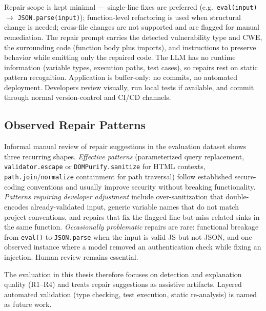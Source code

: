 Repair scope is kept minimal --- single-line fixes are preferred (e.g.\ \texttt{eval(input)} $\to$ \texttt{JSON.parse(input)}); function-level refactoring is used when structural change is needed; cross-file changes are not supported and are flagged for manual remediation. The repair prompt carries the detected vulnerability type and CWE, the surrounding code (function body plus imports), and instructions to preserve behavior while emitting only the repaired code. The LLM has no runtime information (variable types, execution paths, test cases), so repairs rest on static pattern recognition. Application is buffer-only: no commits, no automated deployment. Developers review visually, run local tests if available, and commit through normal version-control and CI/CD channels.

\subsection{Observed Repair Patterns}

Informal manual review of repair suggestions in the evaluation dataset shows three recurring shapes. \emph{Effective patterns} (parameterized query replacement, \texttt{validator.escape} or \texttt{DOMPurify.sanitize} for HTML contexts, \texttt{path.join}/\texttt{normalize} containment for path traversal) follow established secure-coding conventions and usually improve security without breaking functionality. \emph{Patterns requiring developer adjustment} include over-sanitization that double-encodes already-validated input, generic variable names that do not match project conventions, and repairs that fix the flagged line but miss related sinks in the same function. \emph{Occasionally problematic} repairs are rare: functional breakage from \texttt{eval()}-to-\texttt{JSON.parse} when the input is valid JS but not JSON, and one observed instance where a model removed an authentication check while fixing an injection. Human review remains essential.

The evaluation in this thesis therefore focuses on detection and explanation quality (R1--R4) and treats repair suggestions as assistive artifacts. Layered automated validation (type checking, test execution, static re-analysis) is named as future work.
